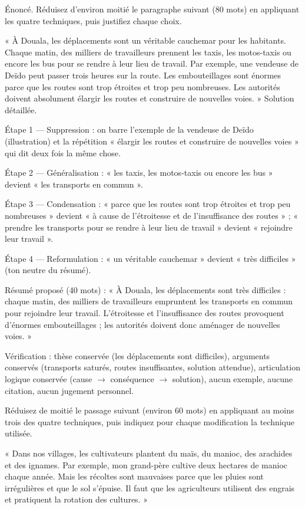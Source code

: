 \documentclass[11pt]{article}
\begin{document}
\begin{exoresolu}
Énoncé. Réduisez d'environ moitié le paragraphe suivant (80 mots) en appliquant les quatre techniques, puis justifiez chaque choix.

« À Douala, les déplacements sont un véritable cauchemar pour les habitants. Chaque matin, des milliers de travailleurs prennent les taxis, les motos-taxis ou encore les bus pour se rendre à leur lieu de travail. Par exemple, une vendeuse de Deïdo peut passer trois heures sur la route. Les embouteillages sont énormes parce que les routes sont trop étroites et trop peu nombreuses. Les autorités doivent absolument élargir les routes et construire de nouvelles voies. »
\tcblower
Solution détaillée.

Étape 1 — Suppression : on barre l'exemple de la vendeuse de Deïdo (illustration) et la répétition « élargir les routes et construire de nouvelles voies » qui dit deux fois la même chose.

Étape 2 — Généralisation : « les taxis, les motos-taxis ou encore les bus » devient « les transports en commun ».

Étape 3 — Condensation : « parce que les routes sont trop étroites et trop peu nombreuses » devient « à cause de l'étroitesse et de l'insuffisance des routes » ; « prendre les transports pour se rendre à leur lieu de travail » devient « rejoindre leur travail ».

Étape 4 — Reformulation : « un véritable cauchemar » devient « très difficiles » (ton neutre du résumé).

Résumé proposé (40 mots) : « À Douala, les déplacements sont très difficiles : chaque matin, des milliers de travailleurs empruntent les transports en commun pour rejoindre leur travail. L'étroitesse et l'insuffisance des routes provoquent d'énormes embouteillages ; les autorités doivent donc aménager de nouvelles voies. »

Vérification : thèse conservée (les déplacements sont difficiles), arguments conservés (transports saturés, routes insuffisantes, solution attendue), articulation logique conservée (cause $\rightarrow$ conséquence $\rightarrow$ solution), aucun exemple, aucune citation, aucun jugement personnel.
\end{exoresolu}

\begin{exercice}
Réduisez de moitié le passage suivant (environ 60 mots) en appliquant au moins trois des quatre techniques, puis indiquez pour chaque modification la technique utilisée.

« Dans nos villages, les cultivateurs plantent du maïs, du manioc, des arachides et des ignames. Par exemple, mon grand-père cultive deux hectares de manioc chaque année. Mais les récoltes sont mauvaises parce que les pluies sont irrégulières et que le sol s'épuise. Il faut que les agriculteurs utilisent des engrais et pratiquent la rotation des cultures. »
\end{exercice}
\end{document}
